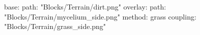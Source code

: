 base:
  path: "Blocks/Terrain/dirt.png"
overlay:
  path: "Blocks/Terrain/mycelium_side.png"
  method: grass
  coupling: "Blocks/Terrain/grass_side.png"